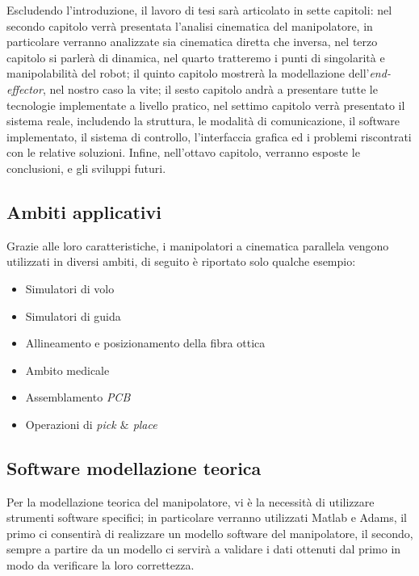 Escludendo l'introduzione, il lavoro di tesi sarà articolato in sette capitoli: nel secondo capitolo verrà presentata l'analisi cinematica del manipolatore, in particolare verranno analizzate sia cinematica diretta che inversa, nel terzo capitolo si parlerà di dinamica, nel quarto tratteremo i punti di singolarità e manipolabilità del robot; il quinto capitolo mostrerà la modellazione dell'\textit{end-effector}, nel nostro caso la vite; il sesto capitolo andrà a presentare tutte le tecnologie implementate a livello pratico, nel settimo capitolo verrà presentato il sistema reale, includendo la struttura, le modalità di comunicazione, il software implementato, il sistema di controllo, l'interfaccia grafica ed i problemi riscontrati con le relative soluzioni. Infine, nell'ottavo capitolo, verranno esposte le conclusioni, e gli sviluppi futuri.
\subsection{Ambiti applicativi}
Grazie alle loro caratteristiche, i manipolatori a cinematica parallela vengono utilizzati in diversi ambiti, di seguito è riportato solo qualche esempio:
\begin{itemize}
	\item Simulatori di volo
	\item Simulatori di guida
	\item Allineamento e posizionamento della fibra ottica
	\item Ambito medicale
	\item Assemblamento \textit{PCB}
	\item Operazioni di \textit{pick $\&$ place}
\end{itemize}

\subsection{Software modellazione teorica}
Per la modellazione teorica del manipolatore, vi è la necessità di utilizzare strumenti software specifici; in particolare verranno utilizzati Matlab e Adams, il primo ci consentirà di realizzare un modello software del manipolatore, il secondo, sempre a partire da un modello ci servirà a validare i dati ottenuti dal primo in modo da verificare la loro correttezza.
